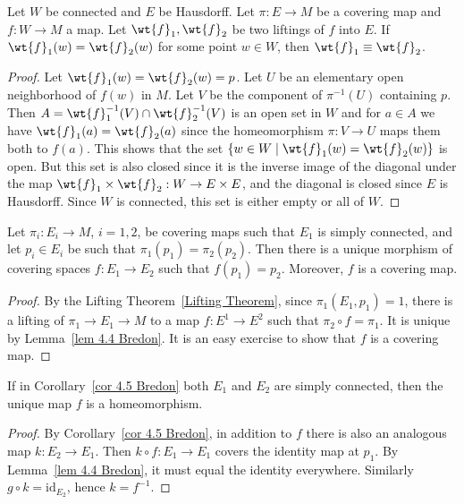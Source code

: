 \begin{lem}\label{lem 4.4 Bredon}
    Let $W$ be connected and $E$ be Hausdorff. Let $\pi:E\to M$ be a covering map and $f:W\to M$ a map. Let $\wt{f}_1,\wt{f}_2$ be two liftings of $f$ into $E$. If $\wt{f}_1(w)=\wt{f}_2(w)$ for some point $w\in W$, then $\wt{f}_1\equiv \wt{f}_2$.
\end{lem}
\begin{proof}
    Let $\wt{f}_1(w)=\wt{f}_2(w)=p$. Let $U$ be an elementary open neighborhood of $f(w)$ in $M$. Let $V$ be the component of $\pi^{-1}(U)$ containing $p$. Then $A=\wt{f}_1^{-1}(V)\cap\wt{f}_2^{-1}(V) $ is an open set in $W$ and for $a\in A$ we have $\wt{f}_1(a)=\wt{f}_2(a)$ since the homeomorphism $\pi:V\to U$ maps them both to $f(a)$. This shows that the set $\{w\in W\mid \wt{f}_1(w)=\wt{f}_2(w)\}$ is open. But this set is also closed since it is the inverse image of the diagonal under the map $\wt{f}_1\times \wt{f}_2:W\to E\times E$, and the diagonal is closed since $E$ is Hausdorff. Since $W$ is connected, this set is either empty or all of $W$.
\end{proof}
\begin{cor}\label{cor 4.5 Bredon}
    Let $\pi_i:E_i\to M$, $i=1,2$, be covering maps such that $E_1$ is simply connected, and let $p_i\in E_i$ be such that $\pi_1(p_1)=\pi_2(p_2)$. Then there is a unique morphism of covering spaces $f:E_1\to E_2$ such that $f(p_1)=p_2$. Moreover, $f$ is a covering map.
\end{cor}
\begin{proof}
    By the Lifting Theorem~\ref{Lifting Theorem}, since $\pi_1(E_1,p_1)=1$, there is a lifting of $\pi_1\to E_1\to M$ to a map $f:E^1\to E^2$ such that $\pi_2\circ f=\pi_1$. It is unique by Lemma~\ref{lem 4.4 Bredon}.  It is an easy exercise to show that $f$ is a covering map.
\end{proof}
\begin{cor}\label{cor 4.6 Bredon}
    If in Corollary~\ref{cor 4.5 Bredon} both $E_1$ and $E_2$ are simply connected, then the unique map $f$ is a homeomorphism.
\end{cor}
\begin{proof}
    By Corollary~\ref{cor 4.5 Bredon}, in addition to $f$ there is also an analogous map $k:E_2\to E_1$. Then $k\circ f:E_1\to E_1$ covers the identity map at $p_1$. By Lemma~\ref{lem 4.4 Bredon}, it must equal the identity everywhere. Similarly $g\circ k=\mathrm{id}_{E_2}$, hence $k=f^{-1}$.
\end{proof}

